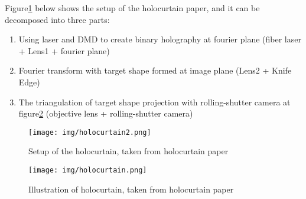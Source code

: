 \documentclass[10pt,journal,compsoc]{IEEEtran}
\begin{document}
Figure\ref{fig:fig3} below shows the setup of the holocurtain paper, and it can be decomposed into three parts: 
\begin{enumerate}
    \item Using laser and DMD to create binary holography at fourier plane (fiber laser + Lens1 + fourier plane)
    \item Fourier transform with target shape formed at image plane (Lens2 + Knife Edge)
    \item The triangulation of target shape projection with rolling-shutter camera at figure\ref{fig:fig4} (objective lens + rolling-shutter camera)
\end{enumerate}
\begin{figure}[!h]
    \centering
    \texttt{[image: img/holocurtain2.png]}
    \caption{Setup of the holocurtain, taken from holocurtain paper\cite{holocurtain}}
    \label{fig:fig3}
\end{figure}
\begin{figure}[!h]
    \centering
    \texttt{[image: img/holocurtain.png]}
    \caption{Illustration of holocurtain, taken from holocurtain paper\cite{holocurtain}}
    \label{fig:fig4}
\end{figure}
\end{document}
